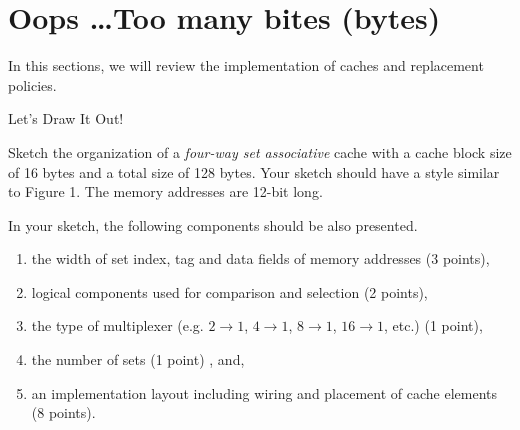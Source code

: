 \section{Oops \dots Too many bites (bytes)}
In this sections, we will review the implementation of caches and
replacement policies.

\begin{questions}

\question[15] Let's Draw It Out!

Sketch the organization of a \emph{four-way set associative} cache
with a cache block size of 16 bytes and a total size of 128 bytes.
Your sketch should have a style similar to Figure 1. The memory
addresses are 12-bit long.

In your sketch, the following components should be also presented.

\begin{enumerate}
    \item the width of set index, tag and data fields of memory
    addresses (3 points),
    \item logical components used for comparison and selection
    (2 points),
    \item the type of multiplexer (e.g. $2\rightarrow1$,
    $4\rightarrow1$, $8\rightarrow1$, $16\rightarrow1$, etc.)
    (1 point),
    \item the number of sets (1 point) , and,
    \item an implementation layout including wiring and placement
    of cache elements (8 points).
\end{enumerate}



{
    \begin{solution}


\end{solution}}
\end{questions}
